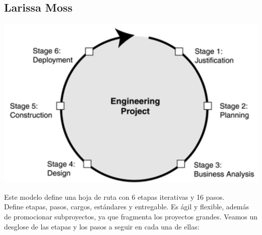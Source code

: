 \subsection{Larissa Moss}

\begin{minipage}{0.4\textwidth}
    \centering
    \includegraphics[width=\linewidth]{fotos/10.png} 
\end{minipage} \hfill
\begin{minipage}{0.6\textwidth}
    Este modelo define una hoja de ruta con 6 etapas iterativas y 16 pasos.  \\

    Define etapas, pasos, cargos, estándares y entregable. Es ágil y flexible, además de promocionar subproyectos, ya que fragmenta los proyectos grandes. Veamos un desglose de las etapas y los pasos a seguir en cada una de ellas:
\end{minipage}


